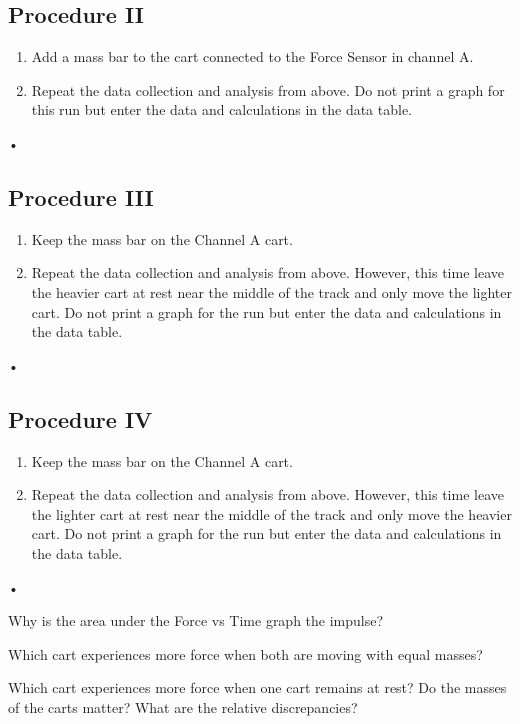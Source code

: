 \documentclass[main.tex]{subfiles}
\begin{document}
\subsection*{Procedure II}
\begin{enumerate}
\item
Add a mass bar to the cart connected to the Force Sensor in channel A.
\item
Repeat the data collection and analysis from above. Do not print a graph for this run but enter the data and calculations in the data table.
\end{enumerate}•

\subsection*{Procedure III}
\begin{enumerate}
\item
Keep the mass bar on the Channel A cart.
\item
Repeat the data collection and analysis from above. However, this time leave the heavier cart at rest near the middle of the track and only move the lighter cart. Do not print a graph for the run but enter the data and calculations in the data table.
\end{enumerate}•

\subsection*{Procedure IV}
\begin{enumerate}
\item
Keep the mass bar on the Channel A cart.
\item
Repeat the data collection and analysis from above. However, this time leave the lighter cart at rest near the middle of the track and only move the heavier cart. Do not print a graph for the run but enter the data and calculations in the data table.
\end{enumerate}•

\begin{question}
Why is the area under the Force vs Time graph the impulse?
\end{question}
\begin{question}
Which cart experiences more force when both are moving with equal masses?
\end{question}
\begin{question}
Which cart experiences more force when one cart remains at rest? Do the masses of the carts matter? What are the relative discrepancies?
\end{question}
\end{document}
